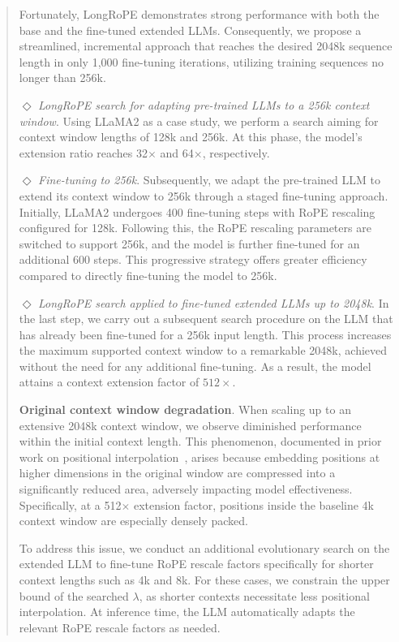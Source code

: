 \begin{abstract}
Fortunately, LongRoPE demonstrates strong performance with both the base and the fine-tuned extended LLMs. Consequently, we propose a streamlined, incremental approach that reaches the desired 2048k sequence length in only 1,000 fine-tuning iterations, utilizing training sequences no longer than 256k.

$\Diamond$ \textit{LongRoPE search for adapting pre-trained LLMs to a 256k context window}. Using LLaMA2 as a case study, we perform a search aiming for context window lengths of 128k and 256k. At this phase, the model’s extension ratio reaches 32$\times$ and 64$\times$, respectively.

$\Diamond$ \textit{Fine-tuning to 256k}. Subsequently, we adapt the pre-trained LLM to extend its context window to 256k through a staged fine-tuning approach. Initially, LLaMA2 undergoes 400 fine-tuning steps with RoPE rescaling configured for 128k. Following this, the RoPE rescaling parameters are switched to support 256k, and the model is further fine-tuned for an additional 600 steps. This progressive strategy offers greater efficiency compared to directly fine-tuning the model to 256k.

$\Diamond$ \textit{LongRoPE search applied to fine-tuned extended LLMs up to 2048k}. In the last step, we carry out a subsequent search procedure on the LLM that has already been fine-tuned for a 256k input length. This process increases the maximum supported context window to a remarkable 2048k, achieved without the need for any additional fine-tuning. As a result, the model attains a context extension factor of $512\times$.

\textbf{Original context window degradation}.  When scaling up to an extensive 2048k context window, we observe diminished performance within the initial context length. This phenomenon, documented in prior work on positional interpolation~\cite{pi}, arises because embedding positions at higher dimensions in the original window are compressed into a significantly reduced area, adversely impacting model effectiveness. Specifically, at a 512$\times$ extension factor, positions inside the baseline 4k context window are especially densely packed.

To address this issue, we conduct an additional evolutionary search on the extended LLM to fine-tune RoPE rescale factors specifically for shorter context lengths such as 4k and 8k. For these cases, we constrain the upper bound of the searched $\lambda$, as shorter contexts necessitate less positional interpolation. At inference time, the LLM automatically adapts the relevant RoPE rescale factors as needed.


\end{abstract}
